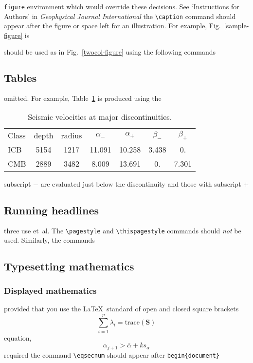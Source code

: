 \verb"figure" environment which would override these decisions. See
`Instructions for Authors' in {\em Geophysical Journal International\/}
the \verb"\caption" command should appear after the figure or space
left for an illustration. For example, Fig.~\ref{sample-figure} is

should be used as in  Fig.~\ref{twocol-figure} using the following commands

\subsection{Tables}

omitted. For example, Table~\ref{symbols} is produced using the
\begin{table}
 \caption{Seismic velocities at major discontinuities.}\label{symbols}
 \begin{tabular}{@{}lcccccc}
  Class & depth & radius
        & $\alpha _{-}$ & $\alpha _{+}$
        & $\beta _{-}$ & $\beta _{+}$ \\
  ICB & 5154 & 1217 & 11.091 & 10.258
        & 3.438 &  0. \\
  CMB & 2889 & 3482 & 8.009 & 13.691
        & 0. & 7.301 \\
 \end{tabular}

 \medskip
subscript $-$ are evaluated just below the discontinuity and those with subscript $+$
\end{table}


\subsection{Running headlines}

three use et~al. The \verb"\pagestyle" and \verb"\thispagestyle"
commands should {\em not\/} be used. Similarly, the commands

\subsection{Typesetting mathematics}

\subsubsection{Displayed mathematics}

provided that you use the \LaTeX\ standard of open and closed square brackets
\[
 \sum_{i=1}^p \lambda_i =
{\mathrm{trace}}(\mathbf{S})
\]
equation, \[ \alpha_{j+1} > \bar{\alpha}+ks_{\alpha} \]
required the command \verb"\eqsecnum" should appear after \verb"begin{document}"

